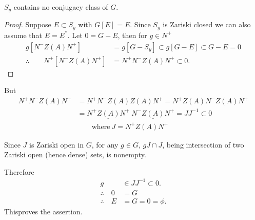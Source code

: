 \begin{lemma}\label{chap3:lem3.6}
  $S_y$ contains no conjugacy class of $G$. 
\end{lemma}

\begin{proof}
  Suppose $E \subset S_y$ with $G[E]=E$. Since $S_y$ is Zariski closed
  we can also assume that $E= E^*$. Let $0 = G -E$, then for $g \in
  N^+$
  \begin{align*}
    g[N^- Z(A)N^+] & = g [G- S_y] \subset g [G-E] \subset G- E =0\\
    \therefore \qquad N^+ [N^- Z(A)N^+] & = N^+ N^- Z(A)N^+ \subset 0.
  \end{align*}
\end{proof}

But 
\begin{align*}
  N^+ N^- Z(A) N^+ & = N^+ N^- Z(A) Z(A) N^+ = N^+ Z(A) N^- Z(A) N^+\\
  & = \underline{N^+ Z(A) N^+}~ \underline{N^- Z(A)N^+} = J J^{-1}
  \subset 0\\
  & \qquad \text{where}~ J = N^+ Z(A)N^+
\end{align*}

Since $J$ is Zariski open in $G$, for any $g \in G$, $g J \cap J$,
being intersection of two Zariski open (hence dense) sets, is
nonempty.

Therefore
\begin{align*}
  g & \in J J^{-1} \subset 0.\\
  \therefore \quad 0 & = G\\
  \therefore \quad E & = G = 0 = \phi.
\end{align*}
This\pageoriginale proves the assertion.
